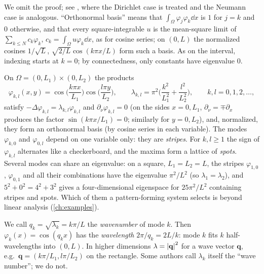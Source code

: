 We omit the proof; see \cite[Ch.~6]{Evans2010}, where the Dirichlet case is treated
and the Neumann case is analogous. ``Orthonormal basis'' means that
$\int_\Omega\varphi_j\varphi_k\dd x$ is $1$ for $j=k$ and $0$ otherwise, and that
every square-integrable $u$ is the mean-square limit of $\sum_{k\le N}c_k\varphi_k$,
$c_k=\int_\Omega u\varphi_k\dd x$, as for cosine series; on $(0,L)$ the normalized
cosines $1/\sqrt L$, $\sqrt{2/L}\cos(k\pi x/L)$ form such a basis. As on the
interval, indexing starts at $k=0$; by connectedness, only constants have eigenvalue
$0$.

\begin{example}[Rectangle]\label{ex:rectangle-eigen}
On $\Omega=(0,L_1)\times(0,L_2)$ the products
\begin{equation*}
  \varphi_{k,l}(x,y)=\cos\Big(\frac{k\pi x}{L_1}\Big)\cos\Big(\frac{l\pi y}{L_2}\Big),
  \qquad
  \lambda_{k,l}=\pi^2\Big(\frac{k^2}{L_1^2}+\frac{l^2}{L_2^2}\Big),
  \qquad k,l=0,1,2,\dots,
\end{equation*}
satisfy $-\Delta\varphi_{k,l}=\lambda_{k,l}\varphi_{k,l}$ and
$\partial_\nu\varphi_{k,l}=0$ (on the sides $x=0,L_1$, $\partial_\nu=\mp\partial_x$
produces the factor $\sin(k\pi x/L_1)=0$; similarly for $y=0,L_2$), and, normalized,
they form an orthonormal basis (by cosine series in each variable). The modes $\varphi_{k,0}$ and $\varphi_{0,l}$
depend on one variable only: they are \emph{stripes}. For $k,l\ge1$ the sign of
$\varphi_{k,l}$ alternates like a checkerboard, and the maxima form a lattice of
\emph{spots}. Several modes can share an eigenvalue: on a square, $L_1=L_2=L$, the
stripes $\varphi_{1,0}$, $\varphi_{0,1}$ and all their combinations have the
eigenvalue $\pi^2/L^2$ (so $\lambda_1=\lambda_2$), and $5^2+0^2=4^2+3^2$ gives a
four-dimensional eigenspace for $25\pi^2/L^2$ containing stripes and spots. Which of
them a pattern-forming system selects is beyond linear analysis (\cref{ch:examples}).
\end{example}

\begin{remark}[Wavenumber]\label{rem:wavenumber}
We call $q_k=\sqrt{\lambda_k}=k\pi/L$ the \emph{wavenumber} of mode $k$. Then
$\varphi_k(x)=\cos(q_kx)$ has the \emph{wavelength} $2\pi/q_k=2L/k$: mode $k$ fits
$k$ half-wavelengths into $(0,L)$. In higher dimensions $\lambda=\left\lvert \mathbf q\right\rvert^2$
for a wave vector $\mathbf q$, e.g.\ $\mathbf q=(k\pi/L_1,l\pi/L_2)$ on the rectangle.
Some authors call $\lambda_k$ itself the ``wave number''; we do not.
\end{remark}

